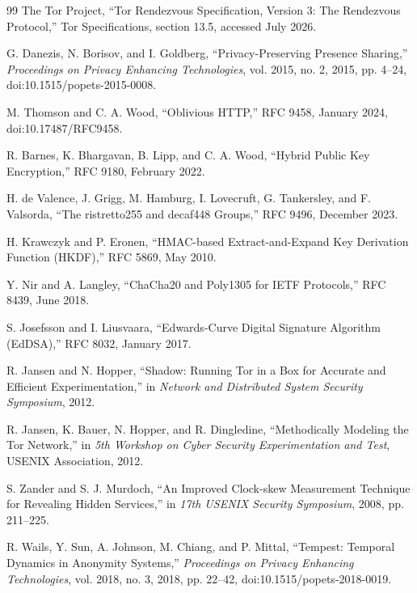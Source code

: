 \documentclass[11pt,oneside]{article}
\begin{document}
\begin{thebibliography}{99}
The Tor Project,
``Tor Rendezvous Specification, Version 3: The Rendezvous Protocol,''
Tor Specifications, section 13.5, accessed July 2026.

G. Danezis, N. Borisov, and I. Goldberg,
``Privacy-Preserving Presence Sharing,''
\emph{Proceedings on Privacy Enhancing Technologies}, vol. 2015, no. 2, 2015, pp. 4--24,
doi:10.1515/popets-2015-0008.

M. Thomson and C. A. Wood,
``Oblivious HTTP,''
RFC 9458, January 2024,
doi:10.17487/RFC9458.

R. Barnes, K. Bhargavan, B. Lipp, and C. A. Wood,
``Hybrid Public Key Encryption,''
RFC 9180, February 2022.

H. de Valence, J. Grigg, M. Hamburg, I. Lovecruft, G. Tankersley, and F. Valsorda,
``The ristretto255 and decaf448 Groups,''
RFC 9496, December 2023.

H. Krawczyk and P. Eronen,
``HMAC-based Extract-and-Expand Key Derivation Function (HKDF),''
RFC 5869, May 2010.

Y. Nir and A. Langley,
``ChaCha20 and Poly1305 for IETF Protocols,''
RFC 8439, June 2018.

S. Josefsson and I. Liusvaara,
``Edwards-Curve Digital Signature Algorithm (EdDSA),''
RFC 8032, January 2017.

R. Jansen and N. Hopper,
``Shadow: Running Tor in a Box for Accurate and Efficient Experimentation,''
in \emph{Network and Distributed System Security Symposium}, 2012.

R. Jansen, K. Bauer, N. Hopper, and R. Dingledine,
``Methodically Modeling the Tor Network,''
in \emph{5th Workshop on Cyber Security Experimentation and Test}, USENIX Association, 2012.

S. Zander and S. J. Murdoch,
``An Improved Clock-skew Measurement Technique for Revealing Hidden Services,''
in \emph{17th USENIX Security Symposium}, 2008, pp. 211--225.

R. Wails, Y. Sun, A. Johnson, M. Chiang, and P. Mittal,
``Tempest: Temporal Dynamics in Anonymity Systems,''
\emph{Proceedings on Privacy Enhancing Technologies}, vol. 2018, no. 3, 2018, pp. 22--42,
doi:10.1515/popets-2018-0019.

\end{thebibliography}
\endgroup
\end{document}
